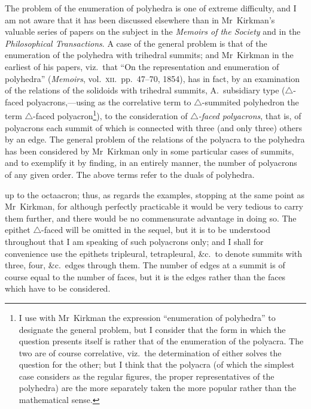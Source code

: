 \documentclass[11pt,a4paper]{article}
\begin{document}
The problem of the enumeration of polyhedra is one of extreme difficulty, and I am not aware that it has been discussed elsewhere than in Mr~Kirkman's valuable series of papers on the subject in the \textit{Memoirs of the Society} and in the \textit{Philosophical Transactions}. A case of the general problem is that of the enumeration of the polyhedra with trihedral summits; and Mr~Kirkman in the earliest of his papers, viz.\ that ``On the representation and enumeration of polyhedra'' (\textit{Memoirs}, vol.\ \textsc{xii}.\ pp.\ 47--70, 1854), has in fact, by an examination of the relations of the solidoids with trihedral summits, A.\ subsidiary type ($\triangle$-faced polyacrons,---using as the correlative term to $\triangle$-summited polyhedron the term $\triangle$-faced polyacron\footnote{I use with Mr~Kirkman the expression ``enumeration of polyhedra'' to designate the general problem, but I consider that the form in which the question presents itself is rather that of the enumeration of the polyacra. The two are of course correlative, viz.\ the determination of either solves the question for the other; but I think that the polyacra (of which the simplest case considers as the regular figures, the proper representatives of the polyhedra) are the more separately taken the more popular rather than the mathematical sense.}), to the consideration of \textit{$\triangle$-faced polyacrons}, that is, of polyacrons each summit of which is connected with three (and only three) others by an edge. The general problem of the relations of the polyacra to the polyhedra has been considered by Mr~Kirkman only in some particular cases of summits, and to exemplify it by finding, in an entirely manner, the number of polyacrons of any given order. The above terms refer to the duals of polyhedra.

\clearpage

\noindent up to the octaacron; thus, as regards the examples, stopping at the same point as Mr~Kirkman, for although perfectly practicable it would be very tedious to carry them further, and there would be no commensurate advantage in doing so. The epithet $\triangle$-faced will be omitted in the sequel, but it is to be understood throughout that I am speaking of such polyacrons only; and I shall for convenience use the epithets tripleural, tetrapleural, \&c.\ to denote summits with three, four, \&c.\ edges through them. The number of edges at a summit is of course equal to the number of faces, but it is the edges rather than the faces which have to be considered.
\end{document}
